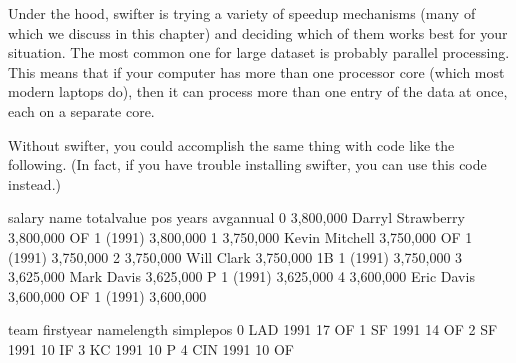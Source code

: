 \documentclass[letterpaper,10pt,english]{jupyterBook}
\begin{document}
\sphinxAtStartPar
Under the hood, swifter is trying a variety of speedup mechanisms (many of which we discuss in this chapter) and deciding which of them works best for your situation.  The most common one for large dataset is probably parallel processing.  This means that if your computer has more than one processor core (which most modern laptops do), then it can process more than one entry of the data at once, each on a separate core.

\sphinxAtStartPar
Without swifter, you could accomplish the same thing with code like the following.  (In fact, if you have trouble installing swifter, you can use this code instead.)

\begin{sphinxVerbatim}[commandchars=\\\{\}]
   
  

    
\PYG{p}{[}\PYG{p}{]}    \PYG{p}{[}\PYG{p}{]}  


\end{sphinxVerbatim}

\begin{sphinxVerbatim}[commandchars=\\\{\}]
        salary               name  total\PYGZus{}value pos     years   avg\PYGZus{}annual  \PYGZbs{}
0  \PYGZdl{} 3,800,000  Darryl Strawberry  \PYGZdl{} 3,800,000  OF  1 (1991)  \PYGZdl{} 3,800,000   
1  \PYGZdl{} 3,750,000     Kevin Mitchell  \PYGZdl{} 3,750,000  OF  1 (1991)  \PYGZdl{} 3,750,000   
2  \PYGZdl{} 3,750,000         Will Clark  \PYGZdl{} 3,750,000  1B  1 (1991)  \PYGZdl{} 3,750,000   
3  \PYGZdl{} 3,625,000         Mark Davis  \PYGZdl{} 3,625,000   P  1 (1991)  \PYGZdl{} 3,625,000   
4  \PYGZdl{} 3,600,000         Eric Davis  \PYGZdl{} 3,600,000  OF  1 (1991)  \PYGZdl{} 3,600,000   

  team  first\PYGZus{}year  name\PYGZus{}length simple\PYGZus{}pos  
0  LAD        1991           17         OF  
1   SF        1991           14         OF  
2   SF        1991           10         IF  
3   KC        1991           10          P  
4  CIN        1991           10         OF  
\end{sphinxVerbatim}
\end{document}
